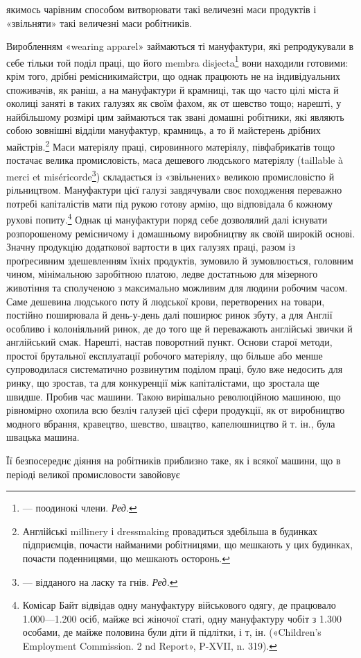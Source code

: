 якимось чарівним способом витворювати такі величезні маси продуктів
і «звільняти» такі величезні маси робітників.

Виробленням «wearing apparel» займаються ті мануфактури,
які репродукували в себе тільки той поділ праці, що його membra
disjecta\footnote*{
— поодинокі члени. \emph{Ред.}
} вони находили готовими: крім того, дрібні ремісникимайстри,
що однак працюють не на індивідуальних споживачів,
як раніш, а на мануфактури й крамниці, так що часто цілі міста
й околиці заняті в таких галузях як своїм фахом, як от шевство
тощо; нарешті, у найбільшому розмірі цим займаються так звані
домашні робітники, які являють собою зовнішні відділи мануфактур,
крамниць, а то й майстерень дрібних майстрів.\footnote{
Англійські millinery і dressmaking провадиться здебільша в
будинках підприємців, почасти найманими робітницями, що мешкають
у цих будинках, почасти поденницями, що мешкають осторонь.
} Маси
матеріялу праці, сировинного матеріялу, півфабрикатів тощо
постачає велика промисловість, маса дешевого людського матеріялу
(taillable à merci et miséricorde\footnote*{
— відданого на ласку та гнів. \emph{Ред.}
}) складається із «звільнених»
великою промисловістю й рільництвом. Мануфактури
цієї галузі завдячували своє походження переважно потребі капіталістів
мати під рукою готову армію, що відповідала б кожному
рухові попиту.\footnote{
Комісар Байт відвідав одну мануфактуру військового одягу,
де працювало 1.000—1.200 осіб, майже всі жіночої статі, одну мануфактуру
чобіт з 1.300 особами, де майже половина були діти й підлітки, і
т, ін. («Children’s Employment Commission. 2 nd Report», P-XVII,
n. 319).
} Однак ці мануфактури поряд себе дозволялий далі
існувати розпорошеному ремісничому і домашньому виробництву
як своїй широкій основі. Значну продукцію додаткової вартости
в цих галузях праці, разом із проґресивним здешевленням їхніх
продуктів, зумовило й зумовлюється, головним чином, мінімальною
заробітною платою, ледве достатньою для мізерного животіння
та сполученою з максимально можливим для людини робочим
часом. Саме дешевина людського поту й людської крови, перетворених
на товари, постійно поширювала й день-у-день далі поширює
ринок збуту, а для Англії особливо і колоніяльний ринок, де
до того ще й переважають англійські звички й англійський смак.
Нарешті, настав поворотний пункт. Основи старої методи, простої
брутальної експлуатації робочого матеріялу, що більше або
менше супроводилася систематично розвинутим поділом праці,
було вже недосить для ринку, що зростав, та для конкуренції
між капіталістами, що зростала ще швидше. Пробив час машини.
Такою вирішально революційною машиною, що рівномірно охопила
всю безліч галузей цієї сфери продукції, як от виробництво
модного вбрання, кравецтво, шевство, швацтво, капелюшництво
й т. ін., була швацька машина.

Її безпосереднє діяння на робітників приблизно таке, як і
всякої машини, що в періоді великої промисловости завойовує
